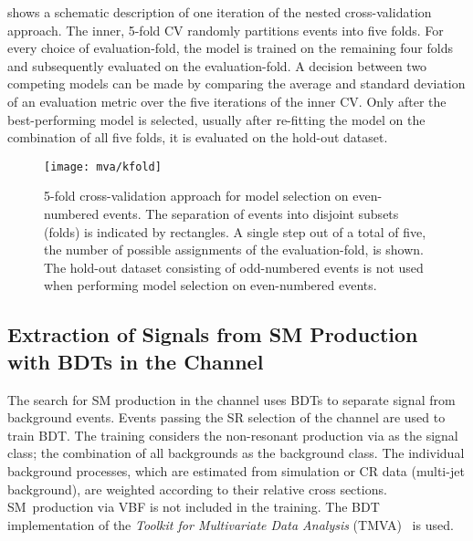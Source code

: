  shows a schematic description of one
iteration of the nested cross-validation approach. The inner, 5-fold
CV randomly partitions events into five folds. For every choice of
evaluation-fold, the model is trained on the remaining four folds and
subsequently evaluated on the evaluation-fold. A decision between two
competing models can be made by comparing the average and standard
deviation of an evaluation metric over the five iterations of the inner
CV. Only after the best-performing model is selected, usually after
re-fitting the model on the combination of all five folds, it is
evaluated on the hold-out dataset.

\begin{figure}[htbp]
  \centering

  \texttt{[image: mva/kfold]}

  \caption[5-fold cross-validation approach for model selection.]{5-fold
    cross-validation approach for model selection on even-numbered events. The
    separation of events into disjoint subsets (folds) is indicated by
    rectangles. A single step out of a total of five, the number of possible
    assignments of the evaluation-fold, is shown. The hold-out dataset
    consisting of odd-numbered events is not used when performing model
    selection on even-numbered events.}%
  \label{fig:cross_validation}
\end{figure}



\subsection{Extraction of Signals from SM \HH Production with BDTs in
  the \hadhad Channel}%
\label{sec:mva_smbdt}

The search for SM \HH production in the \hadhad channel uses BDTs to separate
signal from background events. Events passing the SR selection
of the \hadhad channel are used to train BDT. The training considers the
non-resonant \HH production via \ggF as the signal class; the combination of all
backgrounds as the background class. The individual background processes, which
are estimated from simulation or CR data (multi-jet background), are weighted
according to their relative cross sections. SM~\HH production via VBF is not
included in the training.
The BDT implementation of the \emph{Toolkit for Multivariate Data Analysis}
(TMVA)~\cite{TMVA} is used.


